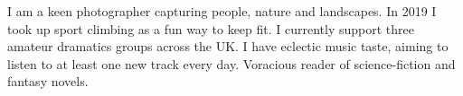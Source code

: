 \sectionsep
{}
\descript{ }
I am a keen photographer capturing people, nature and landscapes. In 2019 I took up sport climbing as a fun way to keep fit. I currently support three amateur dramatics groups across the UK. I have eclectic music taste, aiming to listen to at least one new track every day. Voracious reader of science-fiction and fantasy novels.
\sectionsep
